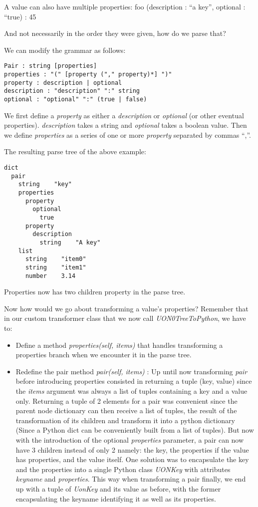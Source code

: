 \documentclass[12pt]{article}
\begin{document}
A value can also have multiple properties:
foo (description : “a key”, optional : “true) : 45

And not necessarily in the order they were given, how do we parse that?

We can modify the grammar as follows: 

\begin{lstlisting}
Pair : string [properties]
properties : "(" [property ("," property)*] ")"
property : description | optional
description : "description" ":" string
optional : "optional" ":" (true | false)
\end{lstlisting}

We first define a \emph{property} as either a \emph{description} or \emph{optional} (or other eventual properties). \emph{description} takes a string and \emph{optional} takes a boolean value. Then we define \emph{properties} as a series of one or more \emph{property} separated by commas “,”. 

The resulting parse tree of the above example:

\begin{lstlisting}
dict
  pair
    string    "key"
    properties
      property
        optional
          true
      property
        description
          string    "A key"
    list
      string    "item0"
      string    "item1"
      number    3.14

\end{lstlisting}

Properties now has two children property in the parse tree.

Now how would we go about transforming a value’s properties? Remember that in our custom transformer class that we now call \emph{UON0TreeToPython}, we have to:
\begin{itemize}
    \item Define a method \emph{properties(self, items)} that handles transforming a properties branch when we encounter it in the parse tree. 
    \item Redefine the pair method \emph{pair(self, items)} : Up until now transforming \emph{pair} before introducing properties consisted in returning a tuple (key, value) since the \emph{items} argument was always a list of tuples containing a key and a value only. Returning a tuple of 2 elements for a pair was convenient since the parent node dictionary can then receive a list of tuples, the result of the transformation of its children and transform it into a python dictionary (Since a Python dict can be conveniently built from a list of tuples). But now with the introduction of the optional \emph{properties} parameter, a pair can now have 3 children instead of only 2 namely: the key, the properties if the value has properties, and the value itself. One solution was to encapsulate the key and the properties into a single Python class \emph{UONKey} with attributes \emph{keyname} and \emph{properties}. This way when transforming a pair finally, we end up with a tuple of \emph{UonKey} and its value as before, with the former encapsulating the keyname identifying it as well as its properties.
\end{itemize}
    
\end{document}
